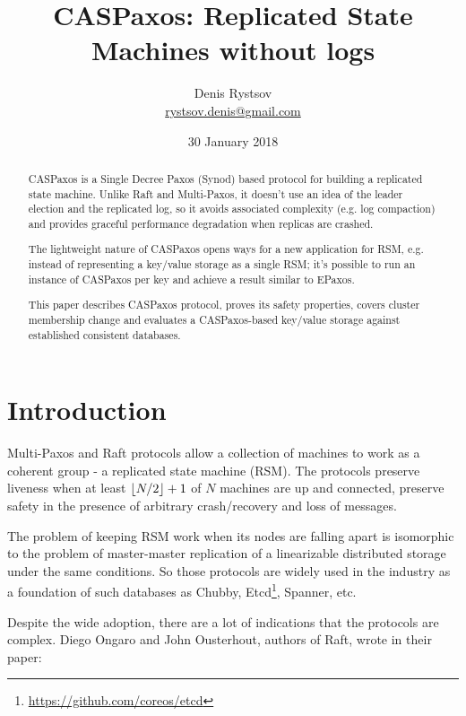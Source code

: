 \documentclass[12pt]{article}
\DeclarePairedDelimiter{\floor}{\lfloor}{\rfloor}
\begin{document}
\title{CASPaxos: Replicated State Machines without logs}
\date{30 January 2018}
\author{Denis Rystsov \\
\href{mailto:rystsov.denis@gmail.com}{rystsov.denis@gmail.com}}


\maketitle

\begin{abstract}
CASPaxos is a Single Decree Paxos (Synod) based protocol for building a replicated state machine. Unlike Raft and Multi-Paxos, it doesn't use an idea of the leader election and the replicated log, so it avoids associated complexity (e.g. log compaction) and provides graceful performance degradation when replicas are crashed.

The lightweight nature of CASPaxos opens ways for a new application for RSM, e.g. instead of representing a key/value storage as a single RSM; it's possible to run an instance of CASPaxos per key and achieve a result similar to EPaxos.

This paper describes CASPaxos protocol, proves its safety properties, covers cluster membership change and evaluates a CASPaxos-based key/value storage against established consistent databases.
\end{abstract}


\section{Introduction}

Multi-Paxos\cite{lamport01} and Raft\cite{raft} protocols allow a collection of machines to work as a coherent group - a replicated state machine (RSM). The protocols preserve liveness when at least $\floor{N/2} + 1$ of $N$ machines are up and connected, preserve safety in the presence of arbitrary crash/recovery and loss of messages.

The problem of keeping RSM work when its nodes are falling apart is isomorphic to the problem of master-master replication of a linearizable distributed storage under the same conditions. So those protocols are widely used in the industry as a foundation of such databases as Chubby\cite{chubby}, Etcd\footnote{\href{https://github.com/coreos/etcd}{https://github.com/coreos/etcd}}, Spanner\cite{spanner}, etc.

Despite the wide adoption, there are a lot of indications that the protocols are complex. Diego Ongaro and John Ousterhout, authors of Raft, wrote in their paper:
\end{document}
